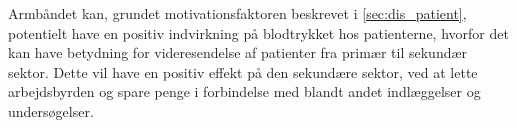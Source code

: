 Armbåndet kan, grundet motivationsfaktoren beskrevet i \autoref{sec:dis_patient}, potentielt have en positiv indvirkning på blodtrykket hos patienterne, hvorfor det kan have betydning for videresendelse af patienter fra primær til sekundær sektor. Dette vil have en positiv effekt på den sekundære sektor, ved at lette arbejdsbyrden og spare penge i forbindelse med blandt andet indlæggelser og undersøgelser.

